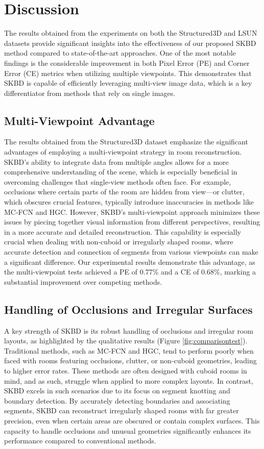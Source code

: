 \section{Discussion}
The results obtained from the experiments on both the Structured3D and LSUN datasets provide significant insights into the effectiveness of our proposed SKBD method compared to state-of-the-art approaches. One of the most notable findings is the considerable improvement in both Pixel Error (PE) and Corner Error (CE) metrics when utilizing multiple viewpoints. This demonstrates that SKBD is capable of efficiently leveraging multi-view image data, which is a key differentiator from methods that rely on single images.

\subsection{Multi-Viewpoint Advantage}
The results obtained from the Structured3D dataset emphasize the significant advantages of employing a multi-viewpoint strategy in room reconstruction. SKBD's ability to integrate data from multiple angles allows for a more comprehensive understanding of the scene, which is especially beneficial in overcoming challenges that single-view methods often face. For example, occlusions where certain parts of the room are hidden from view—or clutter, which obscures crucial features, typically introduce inaccuracies in methods like MC-FCN and HGC. However, SKBD’s multi-viewpoint approach minimizes these issues by piecing together visual information from different perspectives, resulting in a more accurate and detailed reconstruction. This capability is especially crucial when dealing with non-cuboid or irregularly shaped rooms, where accurate detection and connection of segments from various viewpoints can make a significant difference. Our experimental results demonstrate this advantage, as the multi-viewpoint tests achieved a PE of 0.77\% and a CE of 0.68\%, marking a substantial improvement over competing methods.

\subsection{Handling of Occlusions and Irregular Surfaces}
A key strength of SKBD is its robust handling of occlusions and irregular room layouts, as highlighted by the qualitative results (Figure \ref{fig:comparisontest}). Traditional methods, such as MC-FCN and HGC, tend to perform poorly when faced with rooms featuring occlusions, clutter, or non-cuboid geometries, leading to higher error rates. These methods are often designed with cuboid rooms in mind, and as such, struggle when applied to more complex layouts. In contrast, SKBD excels in such scenarios due to its focus on segment knotting and boundary detection. By accurately detecting boundaries and associating segments, SKBD can reconstruct irregularly shaped rooms with far greater precision, even when certain areas are obscured or contain complex surfaces. This capacity to handle occlusions and unusual geometries significantly enhances its performance compared to conventional methods.

